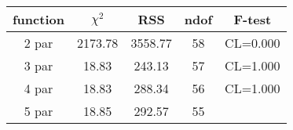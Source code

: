 \begin{tabular}{c|c|c|c|c}
function & $\chi^2$ & RSS & ndof & F-test \\
\hline
2 par & 2173.78 & 3558.77 & 58 & CL=0.000 \\
3 par & 18.83 & 243.13 & 57 & CL=1.000 \\
4 par & 18.83 & 288.34 & 56 & CL=1.000 \\
5 par & 18.85 & 292.57 & 55 & \\
\hline
\end{tabular}